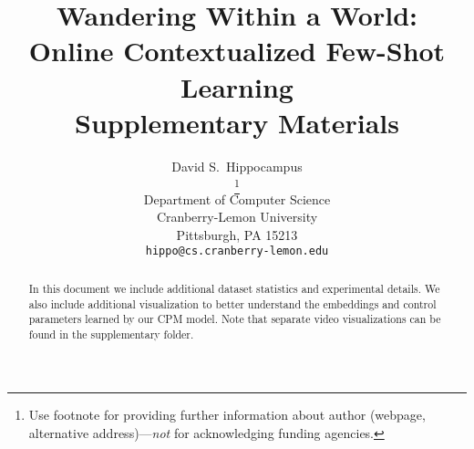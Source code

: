 \documentclass{article}
\title{
Wandering Within a World: \\Online Contextualized Few-Shot Learning \\
Supplementary Materials
}
\author{
  David S.~Hippocampus\\
  \thanks{Use footnote for providing further information
    about author (webpage, alternative address)---\emph{not} for acknowledging
    funding agencies.} \\
  Department of Computer Science\\
  Cranberry-Lemon University\\
  Pittsburgh, PA 15213 \\
  \texttt{hippo@cs.cranberry-lemon.edu}
}
\begin{document}
\maketitle

\begin{abstract}
    In this document we include additional dataset statistics and experimental details. We also include additional visualization to better understand the embeddings and control parameters learned by our CPM model. Note that separate video visualizations can be found in the supplementary folder.
\end{abstract}




\end{document}
